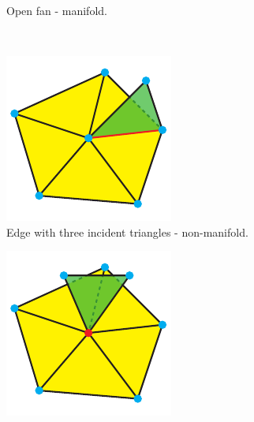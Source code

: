 \begin{description}
\begin{figure}[H]
\begin{subfigure}[b]{0.3\textwidth}
			\caption{
				Open fan - manifold.
			}
			\label{fig:open_fan}
		\end{subfigure}
		\\
		\begin{subfigure}[t]{0.32\textwidth}
			\centering
			\includegraphics[width=\textwidth]{images/non_manifold_edge}
			\caption{
				Edge with three incident triangles - non-manifold.
			}
			\label{fig:non_manifold_edge}
		\end{subfigure}
		\begin{subfigure}[t]{0.32\textwidth}
			\centering
			\includegraphics[width=\textwidth]{images/non_manifold_vertex}

\end{subfigure}
\end{figure}
\end{description}
